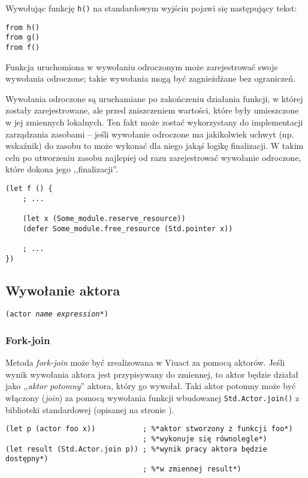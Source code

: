Wywołując funkcję \texttt{h()} na standardowym wyjściu pojawi się następujący tekst:

\begin{verbatim}
from h()
from g()
from f()
\end{verbatim}

Funkcja uruchomiona w wywołaniu odroczonym może zarejestrować swoje wywołania odroczone; takie wywołania
mogą być zagnieżdżane bez ograniczeń.

Wywołania odroczone są uruchamiane po zakończeniu działania funkcji, w której zostały zarejestrowane, ale
przed zniszczeniem wartości, które były umieszczone w jej zmiennych lokalnych. Ten fakt może zostać
wykorzystany do implementacji zarządzania zasobami -- jeśli wywołanie odroczone ma jakikolwiek uchwyt (np.
wskaźnik) do zasobu to może wykonać dla niego jakąś logikę finalizacji. W takim celu po utworzeniu zasobu
najlepiej od razu zarejestrować wywołanie odroczone, które dokona jego ,,finalizacji''.

\begin{lstlisting}
(let f () {
    ; ...

    (let x (Some_module.reserve_resource))
    (defer Some_module.free_resource (Std.pointer x))

    ; ...
})
\end{lstlisting}

\subsection{Wywołanie aktora}
\label{viuact_spec_actor_call}

\texttt{(actor \emph{name} \emph{expression}*)}

\subsubsection{Fork-join}

Metoda \emph{fork-join} może być zrealizowana w Viuact za pomocą aktorów. Jeśli wynik wywołania aktora jest
przypisywany do zmiennej, to aktor będzie działał jako ,,\emph{aktor potomny}'' aktora, który go wywołał. Taki
aktor potomny może być włączony (\emph{join}) za pomocą wywołania funkcji wbudowanej \texttt{Std.Actor.join()}
z biblioteki standardowej (opisanej na stronie \pageref{Std_Actor_join}).

\begin{lstlisting}
(let p (actor foo x))           ; %*aktor stworzony z funkcji foo*)
                                ; %*wykonuje się równolegle*)
(let result (Std.Actor.join p)) ; %*wynik pracy aktora będzie dostępny*)
                                ; %*w zmiennej result*)
\end{lstlisting}

